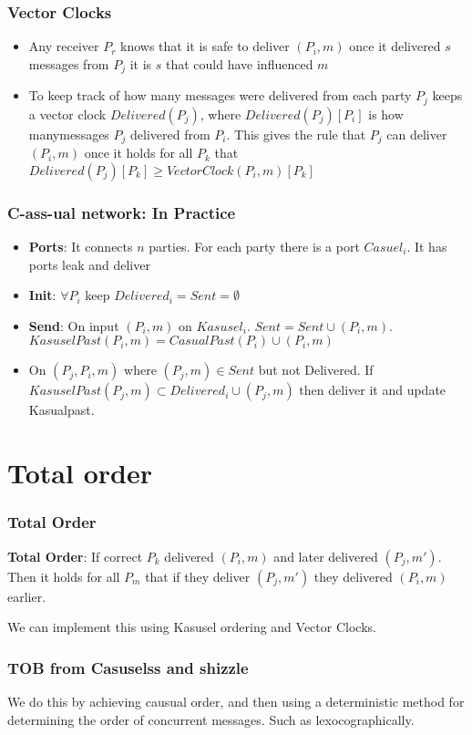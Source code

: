    \begin{frame}
        \frametitle{Vector Clocks}
            \begin{itemize}
                \item Any receiver $P_r$ knows that it is safe to deliver $(P_i, m)$ once it delivered $s$ messages from $P_j$ it is $s$ that could have influenced $m$
                \item To keep track of how many messages were delivered from each party $P_j$ keeps a vector clock $Delivered(P_j)$, where $Delivered(P_j)[P_i]$ is how manymessages $P_j$ delivered from $P_i$. This gives the rule that $P_j$ can deliver $(P_i, m)$ once it holds for all $P_k$ that $Delivered(P_j)[P_k] \geq VectorClock(P_i, m)[P_k]$
            \end{itemize}
    \end{frame}


    \begin{frame}
        \frametitle{C-ass-ual network: In Practice}
            \begin{itemize}
                \item \textbf{Ports}: It connects $n$ parties. For each party there is a port $Casuel_i$. It has ports leak and deliver
                \item \textbf{Init}: $\forall P_i$ keep $Delivered_i = Sent = \emptyset$
                \item \textbf{Send}: On input $(P_i, m)$ on $Kasusel_i$. $Sent = Sent \cup (P_i, m)$. $KasuselPast(P_i, m) = CasualPast(P_i) \cup (P_i, m)$
                \item On $(P_j, P_i, m)$ where $(P_j, m) \in Sent$ but not Delivered. If $KasuselPast(P_j, m) \subset Delivered_i \cup (P_j, m)$ then deliver it and update Kasualpast. 
            \end{itemize}
    \end{frame}

\section{Total order}
    \begin{frame}
        \frametitle{Total Order}
            \textbf{Total Order}: If correct $P_k$ delivered $(P_i, m)$ and later delivered $(P_j, m')$. Then it holds for all $P_m$ that if they deliver $(P_j, m')$ they delivered $(P_i, m)$ earlier. 
        
            We can implement this using Kasusel ordering and Vector Clocks. 
    \end{frame}

        \begin{frame}
            \frametitle{TOB from Casuselss and shizzle}
                We do this by achieving causual order, and then using a deterministic method for determining the order of concurrent messages. Such as lexocographically. 
        \end{frame}



